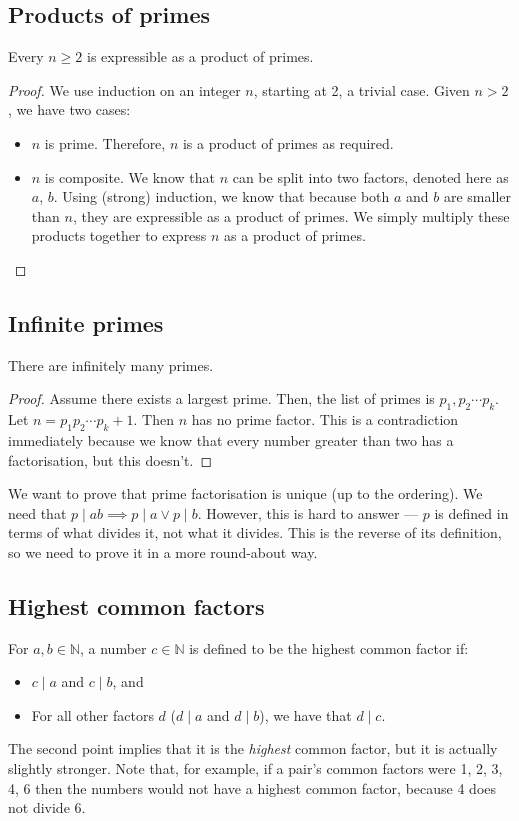 \subsection{Products of primes}
\begin{proposition}
	Every \(n \geq 2\) is expressible as a product of primes.
\end{proposition}
\begin{proof}
	We use induction on an integer \(n\), starting at 2, a trivial case.
	Given \(n > 2\), we have two cases:
	\begin{itemize}
		\item \(n\) is prime.
		      Therefore, \(n\) is a product of primes as required.
		\item \(n\) is composite.
		      We know that \(n\) can be split into two factors, denoted here as \(a\), \(b\).
		      Using (strong) induction, we know that because both \(a\) and \(b\) are smaller than \(n\), they are expressible as a product of primes.
		      We simply multiply these products together to express \(n\) as a product of primes.
	\end{itemize}
\end{proof}

\subsection{Infinite primes}
\begin{proposition}
	There are infinitely many primes.
\end{proposition}
\begin{proof}
	Assume there exists a largest prime.
	Then, the list of primes is \(p_1, p_2 \cdots p_k\).
	Let \(n=p_1 p_2 \cdots p_k + 1\).
	Then \(n\) has no prime factor.
	This is a contradiction immediately because we know that every number greater than two has a factorisation, but this doesn't.
\end{proof}

We want to prove that prime factorisation is unique (up to the ordering).
We need that \(p \mid ab \implies p \mid a \lor p \mid b\).
However, this is hard to answer --- \(p\) is defined in terms of what divides it, not what it divides.
This is the reverse of its definition, so we need to prove it in a more round-about way.

\subsection{Highest common factors}
For \(a, b \in \mathbb N\), a number \(c \in \mathbb N\) is defined to be the highest common factor if:
\begin{itemize}
	\item \(c \mid a\) and \(c \mid b\), and
	\item For all other factors \(d\) (\(d \mid a\) and \(d \mid b\)), we have that \(d \mid c\).
\end{itemize}
The second point implies that it is the \textit{highest} common factor, but it is actually slightly stronger.
Note that, for example, if a pair's common factors were 1, 2, 3, 4, 6 then the numbers would not have a highest common factor, because 4 does not divide 6.

